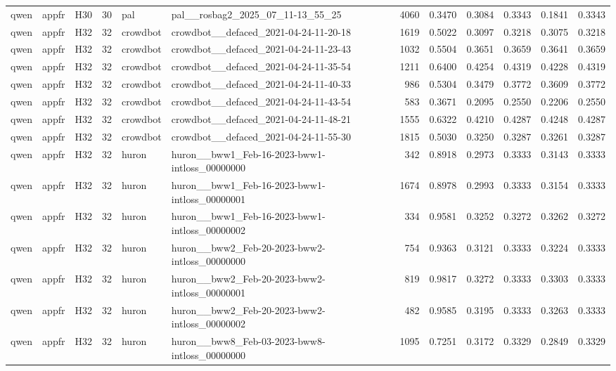 \begin{table}[tbp]
\begin{tabular}{lllrllrrrrrr}
qwen & appfr & H30 & 30 & pal & pal\_\_rosbag2\_2025\_07\_11-13\_55\_25 & 4060 & 0.3470 & 0.3084 & 0.3343 & 0.1841 & 0.3343 \\
qwen & appfr & H32 & 32 & crowdbot & crowdbot\_\_defaced\_2021-04-24-11-20-18 & 1619 & 0.5022 & 0.3097 & 0.3218 & 0.3075 & 0.3218 \\
qwen & appfr & H32 & 32 & crowdbot & crowdbot\_\_defaced\_2021-04-24-11-23-43 & 1032 & 0.5504 & 0.3651 & 0.3659 & 0.3641 & 0.3659 \\
qwen & appfr & H32 & 32 & crowdbot & crowdbot\_\_defaced\_2021-04-24-11-35-54 & 1211 & 0.6400 & 0.4254 & 0.4319 & 0.4228 & 0.4319 \\
qwen & appfr & H32 & 32 & crowdbot & crowdbot\_\_defaced\_2021-04-24-11-40-33 & 986 & 0.5304 & 0.3479 & 0.3772 & 0.3609 & 0.3772 \\
qwen & appfr & H32 & 32 & crowdbot & crowdbot\_\_defaced\_2021-04-24-11-43-54 & 583 & 0.3671 & 0.2095 & 0.2550 & 0.2206 & 0.2550 \\
qwen & appfr & H32 & 32 & crowdbot & crowdbot\_\_defaced\_2021-04-24-11-48-21 & 1555 & 0.6322 & 0.4210 & 0.4287 & 0.4248 & 0.4287 \\
qwen & appfr & H32 & 32 & crowdbot & crowdbot\_\_defaced\_2021-04-24-11-55-30 & 1815 & 0.5030 & 0.3250 & 0.3287 & 0.3261 & 0.3287 \\
qwen & appfr & H32 & 32 & huron & huron\_\_bww1\_Feb-16-2023-bww1-intloss\_00000000 & 342 & 0.8918 & 0.2973 & 0.3333 & 0.3143 & 0.3333 \\
qwen & appfr & H32 & 32 & huron & huron\_\_bww1\_Feb-16-2023-bww1-intloss\_00000001 & 1674 & 0.8978 & 0.2993 & 0.3333 & 0.3154 & 0.3333 \\
qwen & appfr & H32 & 32 & huron & huron\_\_bww1\_Feb-16-2023-bww1-intloss\_00000002 & 334 & 0.9581 & 0.3252 & 0.3272 & 0.3262 & 0.3272 \\
qwen & appfr & H32 & 32 & huron & huron\_\_bww2\_Feb-20-2023-bww2-intloss\_00000000 & 754 & 0.9363 & 0.3121 & 0.3333 & 0.3224 & 0.3333 \\
qwen & appfr & H32 & 32 & huron & huron\_\_bww2\_Feb-20-2023-bww2-intloss\_00000001 & 819 & 0.9817 & 0.3272 & 0.3333 & 0.3303 & 0.3333 \\
qwen & appfr & H32 & 32 & huron & huron\_\_bww2\_Feb-20-2023-bww2-intloss\_00000002 & 482 & 0.9585 & 0.3195 & 0.3333 & 0.3263 & 0.3333 \\
qwen & appfr & H32 & 32 & huron & huron\_\_bww8\_Feb-03-2023-bww8-intloss\_00000000 & 1095 & 0.7251 & 0.3172 & 0.3329 & 0.2849 & 0.3329 \\

\end{tabular}
\end{table}
